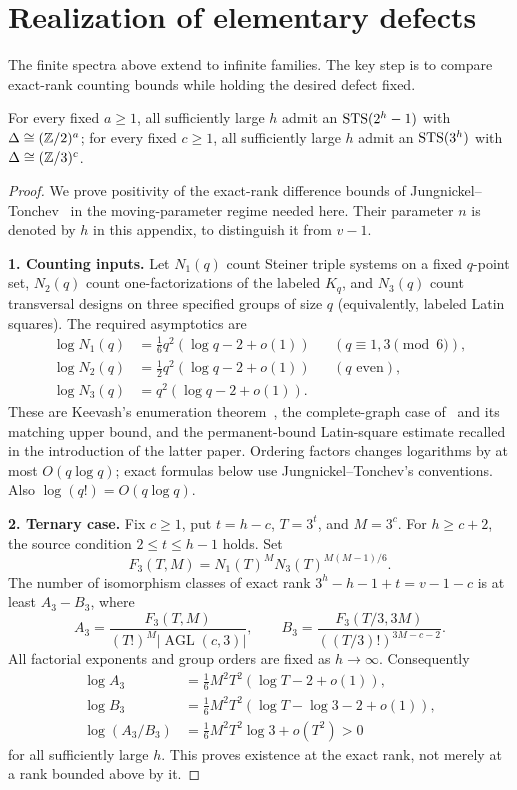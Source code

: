 \section{Realization of elementary defects}\label{sec:app-er}

The finite spectra above extend to infinite families. The key step is to
compare exact-rank counting bounds while holding the desired defect fixed.

\begin{theorem}\label{thm:er}
For every fixed $a\ge1$, all sufficiently large $h$ admit an $\mathrm{STS}(2^{h}-1)$
with $\Delta\cong(\mathbb{Z}/2)^{a}$; for every fixed $c\ge1$, all sufficiently large
$h$ admit an $\mathrm{STS}(3^{h})$ with $\Delta\cong(\mathbb{Z}/3)^{c}$.
\end{theorem}

\begin{proof}
We prove positivity of the exact-rank difference bounds of
Jungnickel--Tonchev~\cite[Theorems 4.4 and 4.12]{JungnickelTonchev} in the
moving-parameter regime needed here. Their parameter $n$ is denoted by $h$
in this appendix, to distinguish it from $v-1$.

\smallskip
\noindent\textbf{1. Counting inputs.} Let $N_1(q)$ count Steiner triple systems on a fixed
$q$-point set, $N_2(q)$ count one-factorizations of the labeled $K_q$, and
$N_3(q)$ count transversal designs on three specified groups of size $q$
(equivalently, labeled Latin squares). The required asymptotics are
\begin{align*}
\log N_1(q)&=\tfrac16q^2(\log q-2+o(1)) &&(q\equiv1,3\pmod6),\\
\log N_2(q)&=\tfrac12q^2(\log q-2+o(1)) &&(q\text{ even}),\\
\log N_3(q)&=q^2(\log q-2+o(1)).
\end{align*}
These are Keevash's enumeration theorem~\cite[Theorem 2.2]{KeevashCounting},
the complete-graph case of~\cite[Theorem 1.2]{FerberJainSudakov} and its
matching upper bound, and the permanent-bound Latin-square estimate recalled
in the introduction of the latter paper. Ordering factors changes logarithms
by at most $O(q\log q)$; exact formulas below use Jungnickel--Tonchev's
conventions. Also $\log(q!)=O(q\log q)$.

\smallskip
\noindent\textbf{2. Ternary case.} Fix $c\ge1$, put $t=h-c$, $T=3^t$, and $M=3^c$.
For $h\ge c+2$, the source condition $2\le t\le h-1$ holds. Set
\[
F_3(T,M)=N_1(T)^M N_3(T)^{M(M-1)/6}.
\]
The number of isomorphism classes of exact rank $3^h-h-1+t=v-1-c$
is at least $A_3-B_3$, where
\[
A_3=\frac{F_3(T,M)}{(T!)^M|\operatorname{AGL}(c,3)|},\qquad
B_3=\frac{F_3(T/3,3M)}{((T/3)!)^{3M-c-2}}.
\]
All factorial exponents and group orders are fixed as $h\to\infty$.
Consequently
\begin{align*}
\log A_3&=\tfrac16M^2T^2(\log T-2+o(1)),\\
\log B_3&=\tfrac16M^2T^2(\log T-\log3-2+o(1)),\\
\log(A_3/B_3)&=\tfrac16M^2T^2\log3+o(T^2)>0
\end{align*}
for all sufficiently large $h$. This proves existence at the exact rank,
not merely at a rank bounded above by it.


\end{proof}
